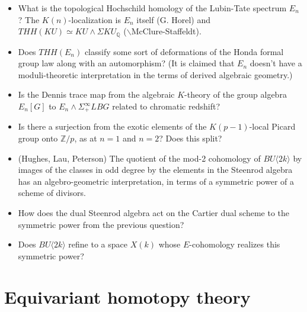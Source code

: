 \documentclass[12pt,titlepage]{article}
\theoremstyle{plain}
\theoremstyle{definition}
\theoremstyle{remark}
\begin{document}
\begin{itemize}
\item What is the topological Hochschild homology of the Lubin-Tate spectrum $E_n$? The $K(n)$-localization is $E_n$ itself (G. Horel) and $THH(KU) \simeq KU \wedge \Sigma KU_{\mathbb{Q}}$ ($\backslash$McClure-Staffeldt).
\item Does $THH(E_n)$ classify some sort of deformations of the Honda formal group law along with an automorphism? (It is claimed that $E_n$ doesn'{}t have a moduli-theoretic interpretation in the terms of derived algebraic geometry.)
\item Is the Dennis trace map from the algebraic $K$-theory of the group algebra $E_n[G]$ to $E_n \wedge \Sigma^\infty_+ LBG$ related to chromatic redshift?
\item Is there a surjection from the exotic elements of the $K(p-1)$-local Picard group onto $\mathbb{Z}/p$, as at $n=1$ and $n=2$? Does this split?
\item (Hughes, Lau, Peterson) The quotient of the mod-2 cohomology of $BU\langle 2k\rangle$ by images of the classes in odd degree by the elements in the Steenrod algebra has an algebro-geometric interpretation, in terms of a symmetric power of a scheme of divisors.
\item How does the dual Steenrod algebra act on the Cartier dual scheme to the symmetric power from the previous question?
\item Does $BU\langle 2k\rangle$ refine to a space $X(k)$ whose $E$-cohomology realizes this symmetric power?

\end{itemize}
\section{Equivariant homotopy theory}
\end{document}
